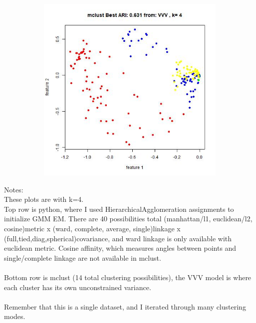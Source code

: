 \documentclass{article}
\begin{document}
\begin{figure}[h!]
\begin{subfigure}[b]{0.3\linewidth}
\end{subfigure} 
\begin{subfigure}[b]{0.3\linewidth}
  \includegraphics[width=\linewidth]{r_ari_k4.jpg}
\end{subfigure}
\end{figure}
Notes: \\
These plots are with k=4.\\
Top row is python, where I used HierarchicalAgglomeration assignments to initialize GMM EM. There are 40 possibilities total (manhattan/l1, euclidean/l2, cosine)metric x (ward, complete, average, single)linkage x (full,tied,diag,spherical)covariance, and ward linkage is only available with euclidean metric. Cosine affinity, which measures angles between points and single/complete linkage are not available in mclust.  \\ \\
Bottom row is mclust (14 total clustering possibilities), the VVV model is where each cluster has its own unconstrained variance. \\ \\
Remember that this is a single dataset, and I iterated through many clustering modes.

\newpage
\end{document}
